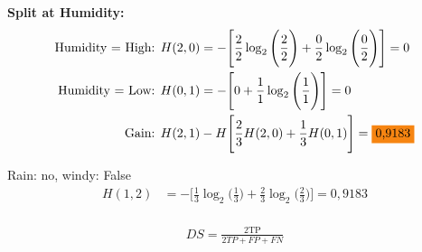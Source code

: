 \documentclass{article}
\begin{document}
\textbf{Split at Humidity:}
\begin{align*}
    \text{Humidity = High: } &H(2,0) = -\Bigg[\frac{2}{2} \log_2\Bigg(\frac{2}{2}\Bigg) + \frac{0}{2} \log_2\Bigg(\frac{0}{2}\Bigg)\Bigg] = 0\\
    \text{Humidity = Low: } &H(0,1) = -\Bigg[0 + \frac{1}{1} \log_2\Bigg(\frac{1}{1}\Bigg)\Bigg] = 0\\
    \text{Gain: } &H(2,1) - H\Bigg[\frac{2}{3} H(2,0) + \frac{1}{3} H(0,1)\Bigg] = \text{\colorbox{BurntOrange}{0,9183}}
\end{align*}

Rain: no, windy: False
\begin{align*}
    H(1,2) &= -\Bigg[\frac{1}{3} \log_2\Bigg(\frac{1}{3}\Bigg) + \frac{2}{3} \log_2\Bigg(\frac{2}{3}\Bigg)\Bigg] = 0,9183\\
\end{align*}

\begin{align*}
    DS = \frac{2\text{TP}}{2TP + FP + FN}
\end{align*}
\end{document}

